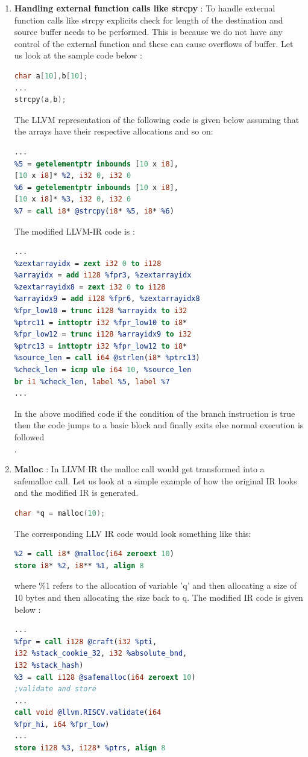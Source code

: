 \begin{enumerate}
    \item \textbf{Handling external function calls like strcpy} : To handle external function calls like strcpy explicits check for length of the destination and source buffer needs to be performed. This is because we do not have any control of the external function and these can cause overflows of buffer. Let us look at the sample code below : 
     \begin{lstlisting}[language=C]
char a[10],b[10];
...
strcpy(a,b);
     \end{lstlisting}
     The LLVM representation of the following code is given below assuming that the arrays have their respective allocations and so on: 
     \begin{lstlisting}[language=LLVM]
...
%5 = getelementptr inbounds [10 x i8],
[10 x i8]* %2, i32 0, i32 0
%6 = getelementptr inbounds [10 x i8],
[10 x i8]* %3, i32 0, i32 0
%7 = call i8* @strcpy(i8* %5, i8* %6)
     \end{lstlisting}
     The modified LLVM-IR code is  : 
     \begin{lstlisting}[language=LLVM]
...
%zextarrayidx = zext i32 0 to i128
%arrayidx = add i128 %fpr3, %zextarrayidx
%zextarrayidx8 = zext i32 0 to i128
%arrayidx9 = add i128 %fpr6, %zextarrayidx8
%fpr_low10 = trunc i128 %arrayidx to i32
%ptrc11 = inttoptr i32 %fpr_low10 to i8*
%fpr_low12 = trunc i128 %arrayidx9 to i32
%ptrc13 = inttoptr i32 %fpr_low12 to i8*
%source_len = call i64 @strlen(i8* %ptrc13)
%check_len = icmp ule i64 10, %source_len
br i1 %check_len, label %5, label %7
...
     \end{lstlisting}
   In the above modified code if the condition of the branch instruction is true then the code jumps to a basic block and finally exits else normal execution is followed\\.   
    
    \item \textbf{Malloc} : In LLVM IR the malloc call would get transformed into a safemalloc call. Let us look at a simple example of how the original IR looks and the modified IR is generated. 
     \begin{lstlisting}[language=C]
char *q = malloc(10);
     \end{lstlisting}
     
     The corresponding LLV IR code would look something like this:
     \begin{lstlisting}[language=LLVM]
%1 = alloca i8*, align 8
%2 = call i8* @malloc(i64 zeroext 10)
store i8* %2, i8** %1, align 8
     \end{lstlisting}
where \%1 refers to the allocation of variable 'q' and then allocating a size of 10 bytes and then allocating the size back to q. The modified IR code is given below : 
    \begin{lstlisting}[language=LLVM]
%1 = alloca i128, align 8
...
%fpr = call i128 @craft(i32 %pti, 
i32 %stack_cookie_32, i32 %absolute_bnd,
i32 %stack_hash)
%3 = call i128 @safemalloc(i64 zeroext 10)
;validate and store
...
call void @llvm.RISCV.validate(i64 
%fpr_hi, i64 %fpr_low)
...
store i128 %3, i128* %ptrs, align 8


\end{lstlisting}
\end{enumerate}
